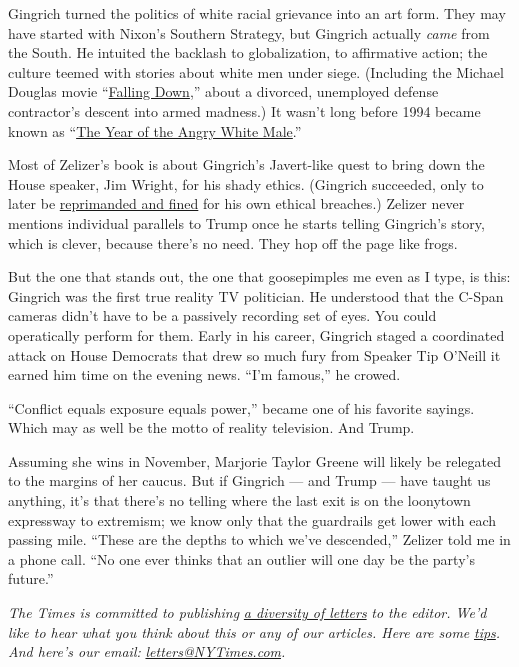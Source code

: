 Gingrich turned the politics of white racial grievance into an art form.
They may have started with Nixon's Southern Strategy, but Gingrich
actually \emph{came} from the South. He intuited the backlash to
globalization, to affirmative action; the culture teemed with stories
about white men under siege. (Including the Michael Douglas movie
``\href{https://www.nytimes3xbfgragh.onion/1993/02/26/movies/review-film-urban-horrors-all-too-familiar.html}{Falling
Down},'' about a divorced, unemployed defense contractor's descent into
armed madness.) It wasn't long before 1994 became known as
``\href{http://ks/edition/Breaking_the_Political_Glass_Ceiling/XnHB9eQJKrkC}{The
Year of the Angry White Male}.''

Most of Zelizer's book is about Gingrich's Javert-like quest to bring
down the House speaker, Jim Wright, for his shady ethics. (Gingrich
succeeded, only to later be
\href{https://archive.nytimes3xbfgragh.onion/www.nytimes3xbfgragh.onion/library/politics/0122gingrich-ethics.html}{reprimanded
and fined} for his own ethical breaches.) Zelizer never mentions
individual parallels to Trump once he starts telling Gingrich's story,
which is clever, because there's no need. They hop off the page like
frogs.

But the one that stands out, the one that goosepimples me even as I
type, is this: Gingrich was the first true reality TV politician. He
understood that the C-Span cameras didn't have to be a passively
recording set of eyes. You could operatically perform for them. Early in
his career, Gingrich staged a coordinated attack on House Democrats that
drew so much fury from Speaker Tip O'Neill it earned him time on the
evening news. ``I'm famous,'' he crowed.

``Conflict equals exposure equals power,'' became one of his favorite
sayings. Which may as well be the motto of reality television. And
Trump.

Assuming she wins in November, Marjorie Taylor Greene will likely be
relegated to the margins of her caucus. But if Gingrich --- and Trump
--- have taught us anything, it's that there's no telling where the last
exit is on the loonytown expressway to extremism; we know only that the
guardrails get lower with each passing mile. ``These are the depths to
which we've descended,'' Zelizer told me in a phone call. ``No one ever
thinks that an outlier will one day be the party's future.''

\emph{The Times is committed to publishing}
\href{https://www.nytimes3xbfgragh.onion/2019/01/31/opinion/letters/letters-to-editor-new-york-times-women.html}{\emph{a
diversity of letters}} \emph{to the editor. We'd like to hear what you
think about this or any of our articles. Here are some}
\href{https://help.nytimes3xbfgragh.onion/hc/en-us/articles/115014925288-How-to-submit-a-letter-to-the-editor}{\emph{tips}}\emph{.
And here's our email:}
\href{mailto:letters@NYTimes.com}{\emph{letters@NYTimes.com}}\emph{.}

